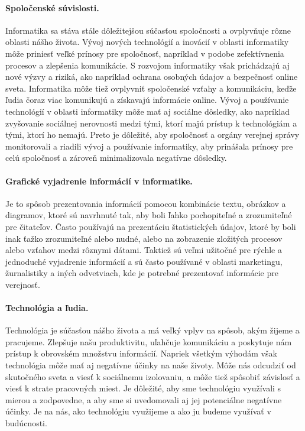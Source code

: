 \documentclass[10pt,oneside,slovak,a4paper]{article}
\begin{document}
\paragraph{Spoločenské súvislosti.}

Informatika sa stáva stále dôležitejšou súčasťou spoločnosti a ovplyvňuje rôzne oblasti nášho života.
Vývoj nových technológií a inovácií v oblasti informatiky môže priniesť veľké prínosy pre spoločnosť, napríklad v podobe zefektívnenia procesov a zlepšenia komunikácie. S rozvojom informatiky však prichádzajú aj nové výzvy a riziká, ako napríklad ochrana osobných údajov a bezpečnosť online sveta.
Informatika môže tiež ovplyvniť spoločenské vzťahy a komunikáciu, keďže ľudia čoraz viac komunikujú a získavajú informácie online.
Vývoj a používanie technológií v oblasti informatiky môže mať aj sociálne dôsledky, ako napríklad zvyšovanie sociálnej nerovnosti medzi tými, ktorí majú prístup k technológiám a tými, ktorí ho nemajú. Preto je dôležité, aby spoločnosť a orgány verejnej správy monitorovali a riadili vývoj a používanie informatiky, aby prinášala prínosy pre celú spoločnosť a zároveň minimalizovala negatívne dôsledky.

\paragraph{Grafické vyjadrenie informácií v informatike.}

Je to spôsob prezentovania informácií pomocou kombinácie textu, obrázkov a diagramov, ktoré sú navrhnuté tak, aby boli ľahko pochopiteľné a zrozumiteľné pre čitateľov. Často používajú na prezentáciu štatistických údajov, ktoré by boli inak ťažko zrozumiteľné alebo nudné, alebo na zobrazenie zložitých procesov alebo vzťahov medzi rôznymi dátami. Taktiež sú veľmi užitočné pre rýchle a jednoduché vyjadrenie informácií a sú často používané v oblasti marketingu, žurnalistiky a iných odvetviach, kde je potrebné prezentovať informácie pre verejnosť.



 \paragraph{Technológia a ľudia.}

Technológia je súčasťou nášho života a má veľký vplyv na spôsob, akým žijeme a pracujeme. Zlepšuje našu produktivitu, uľahčuje komunikáciu a poskytuje nám prístup k obrovském množstvu informácií. Napriek všetkým výhodám však technológia môže mať aj negatívne účinky na naše životy. Môže nás odcudziť od skutočného sveta a viesť k sociálnemu izolovaniu, a môže tiež spôsobiť závislosť a viesť k strate pracovných miest. Je dôležité, aby sme technológiu využívali s mierou a zodpovedne, a aby sme si uvedomovali aj jej potenciálne negatívne účinky. Je na nás, ako technológiu využijeme a ako ju budeme využívať v budúcnosti.
\end{document}
